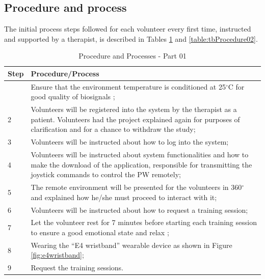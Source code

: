 \subsection{Procedure and process}
\label{sec:procedureProcess}
The initial process steps followed for each volunteer every first time, instructed and supported by a therapist, is described in Tables \ref{table:tbProcedure01} and \ref{table:tbProcedure02}.

\begin{table}[!hbt]
\caption{Procedure and Processes - Part 01}\label{table:tbProcedure01}
\centering
\begin{tabular}{ >{\centering}m{0.5cm}  >{}m{14.5cm} }
\toprule
Step & Procedure/Process \\
\midrule
1  &  Ensure that the environment temperature is conditioned at 25$^{\circ}$C for good quality of biosignals \cite{lanata2014};  \\ \cline{2-2}
2  &  Volunteers will be registered into the system by the therapist as a patient. Volunteers had the project explained again for purposes of clarification and for a chance to withdraw the study; \\ \cline{2-2}
3  &  Volunteers will be instructed about how to log into the system; \\ \cline{2-2}
4  &  Volunteers will be instructed about system functionalities and how to make the download of the application, responsible for transmitting the joystick commands to control the PW remotely; \\ \cline{2-2}
5  &  The remote environment will be presented for the volunteers in 360$^{\circ}$ and explained how he/she must proceed to interact with it; \\ \cline{2-2}
6  &  Volunteers will be instructed about how to request a training session; \\ \cline{2-2}
7  &  Let the volunteer rest for 7 minutes before starting each training session to ensure a good emotional state and relax \cite{lanata2014}; \\ \cline{2-2}
8  &  Wearing the ``E4 wristband'' wearable device as shown in Figure \ref{fig:e4wristband}; \\ \cline{2-2}
9 &  Request the training sessions. \\ 
\bottomrule
\end{tabular}
\end{table}

